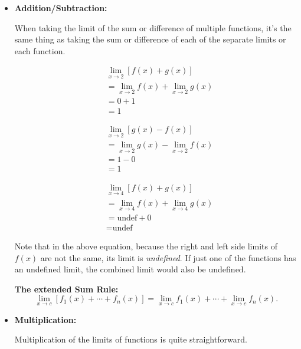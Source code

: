 \documentclass[12pt]{article}
\begin{document}
\begin{itemize}
	\item \textbf{Addition/Subtraction:}

	      When taking the limit of the sum or difference of multiple functions, it's the same thing as taking the sum or difference of each of the separate limits or each function.

	      \begin{align*}
		      & \lim_{x \to 2} \left[ f(x) + g(x) \right]   \\
		      & = \lim_{x \to 2} f(x) + \lim_{x \to 2} g(x) \\
		      & = 0 + 1                                     \\
		      & = 1
	      \end{align*}

	      \begin{align*}
		      & \lim_{x \to 2} \left[ g(x) - f(x) \right]   \\
		      & = \lim_{x \to 2} g(x) - \lim_{x \to 2} f(x) \\
		      & = 1 - 0                                     \\
		      & = 1
	      \end{align*}

	      \begin{align*}
		      & \lim_{x \to 4} \left[ f(x) + g(x) \right]   \\
		      & = \lim_{x \to 4} f(x) + \lim_{x \to 4} g(x) \\
		      & = \text{undef} + 0                          \\
		      & = \text{undef}
	      \end{align*}

	      \indent Note that in the above equation, because the right and left side limits of $f(x)$ are not the same, its limit is \textit{undefined}. If just one of the functions has an undefined limit, the combined limit would also be undefined.

	      \noindent\textbf{The extended Sum Rule:}
	      \begin{equation*}
		      \lim_{x \to c} \left[ f_1(x) + \cdots + f_n(x) \right]
		      = \lim_{x \to c} f_1(x) + \cdots + \lim_{x \to c} f_n(x).
	      \end{equation*}
	      \smallskip

	\item \textbf{Multiplication:}

	      Multiplication of the limits of functions is quite straightforward.


\end{itemize}
\end{document}
